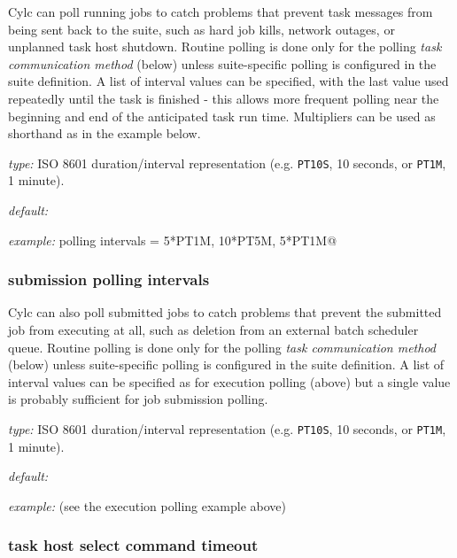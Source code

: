 Cylc can poll running jobs to catch problems that prevent task messages
from being sent back to the suite, such as hard job kills, network
outages, or unplanned task host shutdown. Routine polling is done only
for the polling {\em task communication method} (below) unless
suite-specific polling is configured in the suite definition.
A list of interval values can be specified, with the last value used
repeatedly until the task is finished - this allows more frequent
polling near the beginning and end of the anticipated task run time.
Multipliers can be used as shorthand as in the example below.

\begin{myitemize}
\item {\em type:} ISO 8601 duration/interval representation (e.g.
\lstinline=PT10S=, 10 seconds, or \lstinline=PT1M=, 1 minute).
\item {\em default:}
\item {\em example:} \lstinline@execution polling intervals = 5*PT1M, 10*PT5M, 5*PT1M@
\end{myitemize}


\subsubsection{submission polling intervals}
\label{submission_polling}

Cylc can also poll submitted jobs to catch problems that prevent the
submitted job from executing at all, such as deletion from an external
batch scheduler queue. Routine polling is done only for the polling {\em
task communication method} (below) unless suite-specific polling
is configured in the suite definition. A list of interval
values can be specified as for execution polling (above) but a single
value is probably sufficient for job submission polling.

\begin{myitemize}
\item {\em type:} ISO 8601 duration/interval representation (e.g.
\lstinline=PT10S=, 10 seconds, or \lstinline=PT1M=, 1 minute).
\item {\em default:}
\item {\em example:} (see the execution polling example above)
\end{myitemize}

\subsubsection{task host select command timeout}

